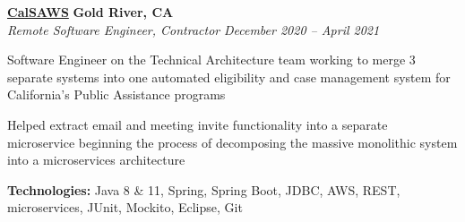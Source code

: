 %
    \headerrow
        {\textbf{\href{https://www.calsaws.org/}{CalSAWS}}}
        {\textbf{Gold River, CA}}
    \\
    \headerrow
        {\emph{Remote Software Engineer, Contractor}}
        {\emph{December 2020 -- April 2021}}
    \begin{itemize*}
        \item Software Engineer on the Technical Architecture team working to merge 3 separate systems into
            one automated eligibility and case management system for California's Public Assistance programs
        \item Helped extract email and meeting invite functionality into a separate microservice beginning the process of decomposing
            the massive monolithic system into a microservices architecture
    \end{itemize*}

    \hspace{1.0em}
        {\textbf{Technologies:} Java 8 \& 11, Spring, Spring Boot, JDBC, AWS, REST, microservices, JUnit, Mockito, Eclipse, Git}

